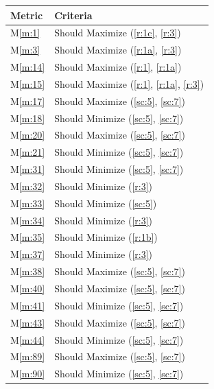 \documentclass{report}
\newcommand{\mref}[1]{M\ref{#1}}
\begin{document}
\begin{tabular}{|l|p{14.35cm}|}
    \hline
    \textbf{Metric} & \textbf{Criteria} \\
    \hline
    \mref{m:1} & Should Maximize \hfill (\ref{r:1c}, \ref{r:3}) \\
    \hline
    \mref{m:3} & Should Maximize \hfill (\ref{r:1a}, \ref{r:3}) \\
    \hline
    \mref{m:14} & Should Maximize \hfill (\ref{r:1}, \ref{r:1a}) \\
    \hline
    \mref{m:15} & Should Maximize \hfill (\ref{r:1}, \ref{r:1a}, \ref{r:3}) \\
    \hline
    \mref{m:17} & Should Maximize \hfill (\ref{sc:5}, \ref{sc:7}) \\
    \hline
    \mref{m:18} & Should Minimize \hfill (\ref{sc:5}, \ref{sc:7}) \\
    \hline
    \mref{m:20} & Should Maximize \hfill (\ref{sc:5}, \ref{sc:7}) \\
    \hline
    \mref{m:21} & Should Minimize \hfill (\ref{sc:5}, \ref{sc:7}) \\
    \hline
    \mref{m:31} & Should Minimize \hfill (\ref{sc:5}, \ref{sc:7}) \\
    \hline
    \mref{m:32} & Should Minimize \hfill (\ref{r:3}) \\
    \hline
    \mref{m:33} & Should Minimize \hfill (\ref{sc:5}) \\
    \hline
    \mref{m:34} & Should Minimize \hfill (\ref{r:3}) \\
    \hline
    \mref{m:35} & Should Minimize \hfill (\ref{r:1b}) \\
    \hline
    \mref{m:37} & Should Minimize \hfill (\ref{r:3}) \\
    \hline
    \mref{m:38} & Should Maximize \hfill (\ref{sc:5}, \ref{sc:7}) \\
    \hline
    \mref{m:40} & Should Maximize \hfill (\ref{sc:5}, \ref{sc:7}) \\
    \hline
    \mref{m:41} & Should Minimize \hfill (\ref{sc:5}, \ref{sc:7}) \\
    \hline
    \mref{m:43} & Should Maximize \hfill (\ref{sc:5}, \ref{sc:7}) \\
    \hline
    \mref{m:44} & Should Minimize \hfill (\ref{sc:5}, \ref{sc:7}) \\
    \hline
    \mref{m:89} & Should Maximize \hfill (\ref{sc:5}, \ref{sc:7}) \\
    \hline
    \mref{m:90} & Should Minimize \hfill (\ref{sc:5}, \ref{sc:7}) \\

\end{tabular}
\end{document}
